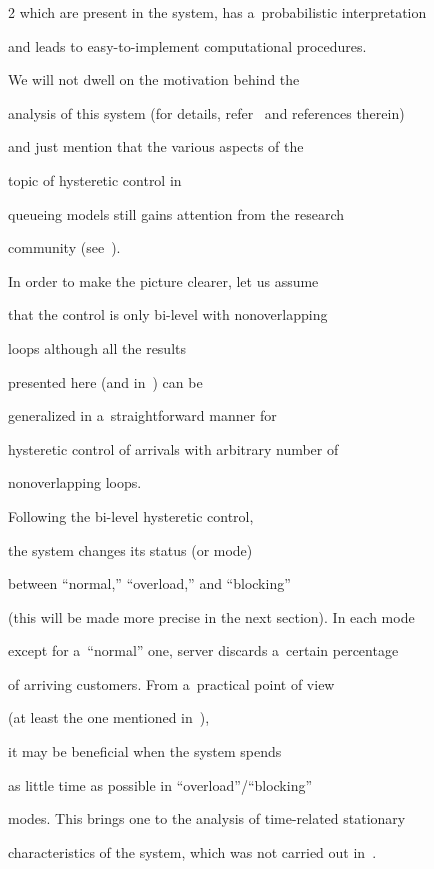 \begin{multicols}{2}
which are present in the system, has a~probabilistic interpretation


and leads to easy-to-implement computational procedures.  


We will not dwell on the motivation behind the 


analysis of this system (for details, refer~\cite{int0} and references therein)


and just mention that the various aspects of the 


topic of hysteretic control in 


queueing models still gains attention from the research 


community (see~\cite{int2, int3, int4}).





In order to make the picture clearer, let us assume 


that the control is only bi-level with nonoverlapping 


loops although all the results 


presented here (and in~\cite{int0}) can be 


generalized in a~straightforward manner for 


hysteretic control of arrivals with arbitrary number of 


nonoverlapping loops. 


Following the bi-level hysteretic control, 


the system changes its status (or mode) 


between ``normal,'' ``overload,'' and ``blocking'' 


(this will be made more precise in the next section). In each mode 


except for a~``normal'' one, server discards a~certain percentage 


of arriving customers. From a~practical point of view 


(at least the one mentioned in~\cite{int1}), 


it may be beneficial when the system spends 


as little time as possible in ``overload''/``blocking'' 


modes. This brings one to the analysis of time-related stationary


characteristics of the system, which was not carried out in~\cite{int0}.






\end{multicols}
